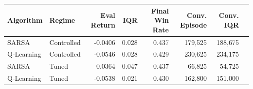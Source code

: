 \begin{tabular}{llrrrrrr}
\hline
\textbf{Algorithm} & \textbf{Regime} & \textbf{Eval Return} & \textbf{IQR} & \textbf{Final Win Rate} & \textbf{Conv. Episode} & \textbf{Conv. IQR} \\
\hline
SARSA & Controlled & -0.0406 & 0.028 & 0.437 & 179,525 & 188,675 \\
Q-Learning & Controlled & -0.0546 & 0.028 & 0.429 & 230,625 & 234,175 \\
\hline
SARSA & Tuned & -0.0364 & 0.047 & 0.437 & 66,825 & 54,725 \\
Q-Learning & Tuned & -0.0538 & 0.021 & 0.430 & 162,800 & 151,000 \\
\hline
\end{tabular}
